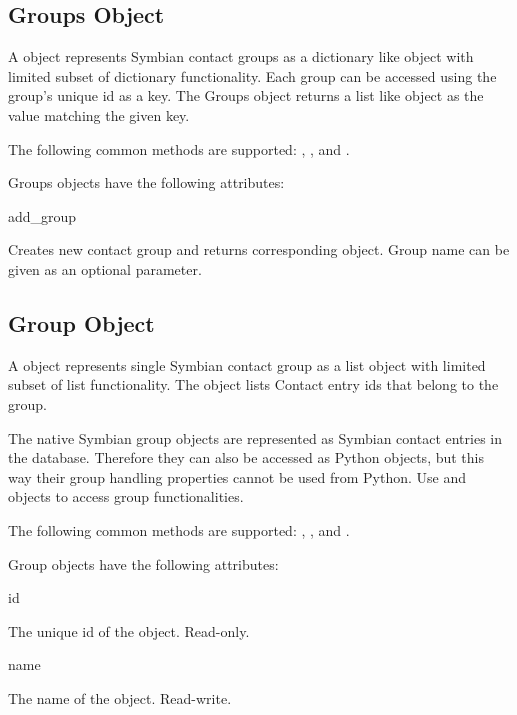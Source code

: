 \subsection{Groups Object}
\label{subsec:groups}

A  object represents Symbian contact groups as a dictionary
like object with limited subset of dictionary functionality. Each group can
be accessed using the group's unique id as a key. The Groups object returns 
a list like  object as the value matching the given key.

The following common methods are supported: , ,
 and .

\begin{classdesc*}{Groups}
 objects have the following attributes:

\begin{methoddesc}[Groups]{add_group}{}

Creates new contact group and returns corresponding  object.
Group name can be given as an optional parameter.

\end{methoddesc}

\end{classdesc*}



\subsection{Group Object}
\label{subsec:group}

A  object represents single Symbian contact group as a list object 
with limited subset of list functionality. The  object lists Contact
entry ids that belong to the group.

The native Symbian group objects are represented as Symbian contact entries in
the database. Therefore they can also be accessed as Python  objects,
 but this way their group handling properties cannot be used from Python. Use 
 and  objects to access group functionalities. 

The following common methods are supported: , ,
 and .

\begin{classdesc*}{Group}
 objects have the following attributes:

\begin{memberdesc}[Group]{id}

The unique id of the  object. Read-only.

\end{memberdesc}

\begin{memberdesc}[Group]{name}

The name of the  object. Read-write.

\end{memberdesc}

\end{classdesc*}

\newpage










